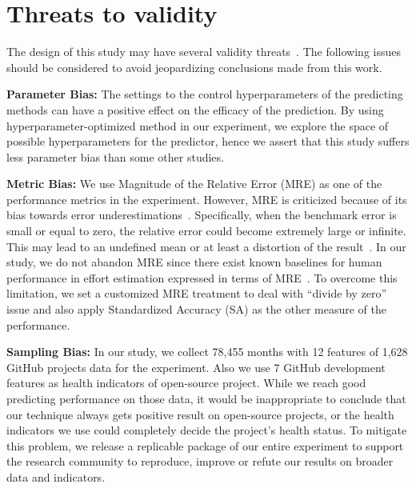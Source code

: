 \documentclass[sigconf,review,anonymous]{acmart}
\begin{document}
\section{Threats to validity}
\label{sect:threa}
The design of this study may have several validity threats~\cite{feldt2010validity}. The following issues should be considered to avoid jeopardizing conclusions made from this work.
 

\textbf{Parameter Bias:} The settings to the control hyperparameters of the predicting methods can have a positive effect on the efficacy of the prediction. By using hyperparameter-optimized method in our experiment, we explore the space of possible hyperparameters for the predictor, hence we assert that this study suffers less parameter bias than some other studies.

\textbf{Metric Bias:} We use Magnitude of the Relative Error (MRE) as one of the performance metrics in the experiment. However, MRE is criticized because of its bias towards error underestimations~\cite{foss2003simulation,kitchenham2001accuracy,korte2008confidence,port2008comparative,shepperd2000building,stensrud2003further}. Specifically, when the benchmark error is small or equal to zero, the relative error could become extremely large or infinite. This may lead to an undefined mean or at least a distortion of the result~\cite{chen2017new}. In our study, we do not abandon MRE since there exist known baselines for human performance in effort estimation expressed in terms of MRE~\cite{Jorgensen03}. To overcome this limitation, we set a customized MRE treatment to deal with ``divide by zero'' issue and also apply Standardized Accuracy (SA) as the other measure of the performance.

\textbf{Sampling Bias:} 
In our study, we collect 78,455 months with 12 features of 1,628 GitHub projects data for the experiment. Also we use 7 GitHub development features as health indicators of open-source project. While we reach good predicting performance on those data, it would be inappropriate to conclude that our technique always gets positive result on open-source projects, or the health indicators we use could completely decide the project's health status. To mitigate this problem, we release a replicable package of our entire experiment to support the research community to reproduce, improve or refute our results on broader data and indicators.

 

\end{document}
